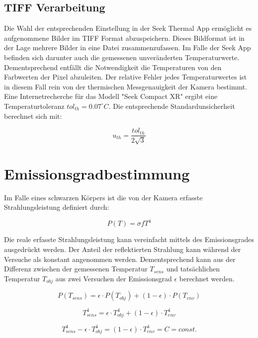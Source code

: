 \documentclass[10pt,a4paper,german]{article}
\begin{document}
\subsection{TIFF Verarbeitung}
Die Wahl der entsprechenden Einstellung in der Seek Thermal App ermöglicht es aufgenommene Bilder im TIFF Format abzuspeichern. 
Dieses Bildformat ist in der Lage mehrere Bilder in eine Datei zusammenzufassen.
Im Falle der Seek App befinden sich darunter auch die gemessenen unveränderten Temperaturwerte.
Dementsprechend entfällt die Notwendigkeit die Temperaturen von den Farbwerten der Pixel abzuleiten.
Der relative Fehler jedes Temperaturwertes ist in diesem Fall rein von der thermischen Messgenauigkeit der Kamera bestimmt.
Eine Internetrecherche für das Modell "Seek Compact XR" ergibt eine Temperaturtoleranz $tol_{th} = 0.07 ^{\circ}C$.
Die entsprechende Standardunsicherheit berechnet sich mit:

\begin{equation}
    u_{th} = \frac{tol_{th}}{2\sqrt{3}}
\end{equation}

\section{Emissionsgradbestimmung}
Im Falle eines schwarzen Körpers ist die von der Kamera erfasste Strahlungsleistung definiert durch:

\begin{equation}
    P(T) = \sigma f T^4
\end{equation}

Die reale erfasste Strahlungsleistung kann vereinfacht mittels des Emissionsgrades ausgedrückt werden. 
Der Anteil der reflektierten Strahlung kann während der Versuche als konstant angenommen werden.
Dementsprechend kann aus der Differenz zwischen der gemessenen Temperatur $T_\textit{sens}$ und tatsächlichen Temperatur $T_\textit{obj}$ aus zwei Versuchen der Emissionsgrad $\epsilon$ berechnet werden.

\begin{equation}
    P(T_\textit{sens}) = \epsilon \cdot P(T_\textit{obj}) + (1 - \epsilon) \cdot P(T_\textit{env})
\end{equation}

\begin{equation}
   T_\textit{sens}^4 = \epsilon \cdot T_\textit{obj}^4 + (1 - \epsilon) \cdot T_\textit{env}^4
\end{equation}

\begin{equation}
    T_\textit{sens}^4 - \epsilon \cdot T_\textit{obj}^4 = (1 - \epsilon) \cdot T_\textit{env}^4 = C = \textit{const.}
\end{equation}
\end{document}
